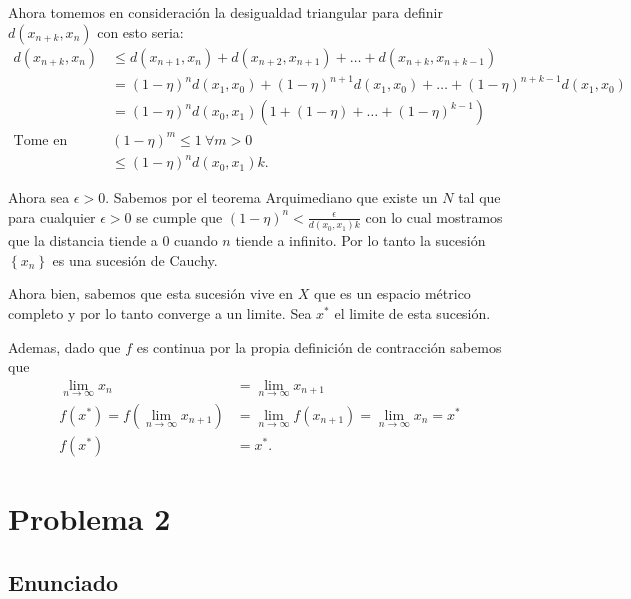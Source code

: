 \documentclass{report}
\begin{document}
Ahora tomemos en consideración la desigualdad triangular para definir $d\left( x_{n + k}, x_n \right) $ con esto seria:
\begin{align*}
  d\left( x_{n + k}, x_n \right) &\le  d\left( x_{n + 1}, x_{n} \right) + d\left( x_{n + 2}, x_{n + 1} \right) + \ldots + d\left( x_{n + k}, x_{n + k - 1} \right)  \\
  &= \left( 1 - \eta \right)^{n}d\left( x_1, x_0 \right) + \left( 1 - \eta \right)^{n + 1}d\left( x_1, x_0 \right) + \ldots + \left( 1 - \eta \right)^{n + k - 1}d\left( x_1, x_0 \right)   \\
  &= \left( 1 - \eta \right)^{n} d\left( x_0, x_1 \right)\left( 1 + \left( 1 - \eta \right) + \ldots + \left( 1 - \eta \right)^{k - 1} \right)   \\
  \text{Tome en consideración que : }& \left( 1 - \eta \right)^{m} \le 1\ \forall m > 0\\
				     &\le \left( 1 - \eta \right)^{n}d\left( x_0, x_1 \right)k
.\end{align*}

Ahora sea $\epsilon > 0$. Sabemos por el teorema Arquimediano que existe un $N$ tal que para cualquier $\epsilon > 0$ se cumple que $\left( 1 - \eta \right)^{n} < \frac{\epsilon}{d\left( x_0, x_1 \right) k}$ con lo cual mostramos que la distancia tiende a 0 cuando $n$ tiende a infinito. Por lo tanto la sucesión $\left\{ x_n \right\} $ es una sucesión de Cauchy.

Ahora bien, sabemos que esta sucesión vive en $X$ que es un espacio métrico completo y por lo tanto converge a un limite. Sea $x^{*}$ el limite de esta sucesión. 

Ademas, dado que $f$ es continua por la propia definición de contracción sabemos que
 \begin{align*}
   \lim_{n \to \infty} x_n &= \lim_{n \to \infty} x_{n + 1}\\
   f\left( x^{*} \right) = f\left( \lim_{n \to \infty} x_{n + 1} \right) &= \lim_{n \to \infty} f\left( x_{n + 1} \right) = \lim_{n \to \infty} x_n = x^{*}\\
   f\left( x^{*} \right) &= x^{*}
.\end{align*}


\chapter{Problema 2}
\section{Enunciado}
\end{document}
